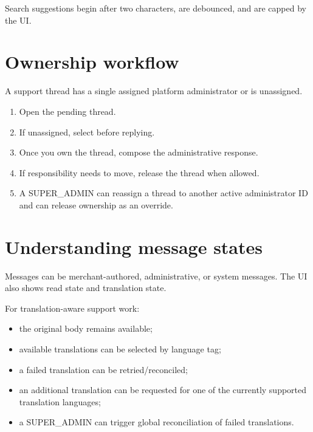 Search suggestions begin after two characters, are debounced, and are capped by the UI.

\section{Ownership workflow}
A support thread has a single assigned platform administrator or is unassigned.

\begin{enumerate}
  \item Open the pending thread.
  \item If unassigned, select  before replying.
  \item Once you own the thread, compose the administrative response.
  \item If responsibility needs to move, release the thread when allowed.
  \item A SUPER\_ADMIN can reassign a thread to another active administrator ID and can release ownership as an override.
\end{enumerate}



\section{Understanding message states}
Messages can be merchant-authored, administrative, or system messages. The UI also shows read state and translation state.

For translation-aware support work:
\begin{itemize}
  \item the original body remains available;
  \item available translations can be selected by language tag;
  \item a failed translation can be retried/reconciled;
  \item an additional translation can be requested for one of the currently supported translation languages;
  \item a SUPER\_ADMIN can trigger global reconciliation of failed translations.
\end{itemize}


